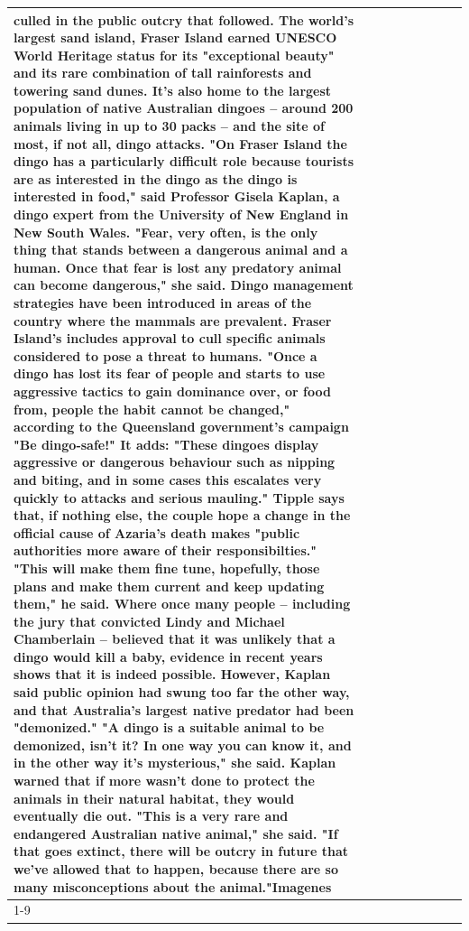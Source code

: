 \begin{table}[H]
\begin{tabular}{lllrlllll}
culled in the public outcry that followed. The world's largest sand island, Fraser Island earned UNESCO World Heritage status for its "exceptional beauty" and its rare combination of tall rainforests and towering sand dunes. It's also home to the largest population of native Australian dingoes -- around 200 animals living in up to 30 packs -- and the site of most, if not all, dingo attacks. "On Fraser Island the dingo has a particularly difficult role because tourists are as interested in the dingo as the dingo is interested in food," said Professor Gisela Kaplan, a dingo expert from the University of New England in New South Wales. "Fear, very often, is the only thing that stands between a dangerous animal and a human. Once that fear is lost any predatory animal can become dangerous," she said. Dingo management strategies have been introduced in areas of the country where the mammals are prevalent. Fraser Island's includes approval to cull specific animals considered to pose a threat to humans. "Once a dingo has lost its fear of people and starts to use aggressive tactics to gain dominance over, or food from, people the habit cannot be changed," according to the Queensland government's campaign "Be dingo-safe!" It adds: "These dingoes display aggressive or dangerous behaviour such as nipping and biting, and in some cases this escalates very quickly to attacks and serious mauling." Tipple says that, if nothing else, the couple hope a change in the official cause of Azaria's death makes "public authorities more aware of their responsibilties." "This will make them fine tune, hopefully, those plans and make them current and keep updating them," he said. Where once many people -- including the jury that convicted Lindy and Michael Chamberlain -- believed that it was unlikely that a dingo would kill a baby, evidence in recent years shows that it is indeed possible. However, Kaplan said public opinion had swung too far the other way, and that Australia's largest native predator had been "demonized." "A dingo is a suitable animal to be demonized, isn't it? In one way you can know it, and in the other way it's mysterious," she said. Kaplan warned that if more wasn't done to protect the animals in their natural habitat, they would eventually die out. "This is a very rare and endangered Australian native animal," she said. "If that goes extinct, there will be outcry in future that we've allowed that to happen, because there are so many misconceptions about the animal."Imagenes \\
\cline{1-9}

\end{tabular}
\end{table}
